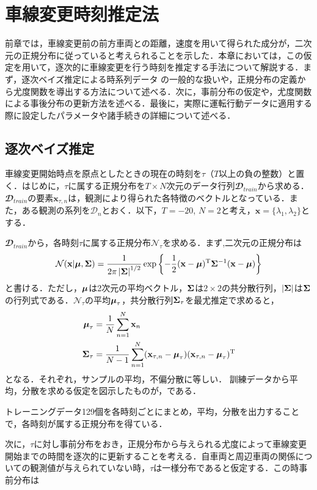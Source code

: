 \chapter{車線変更時刻推定法}
前章では，車線変更前の前方車両との距離，速度を用いて得られた成分が，二次元の正規分布に従っていると考えられることを示した．本章においては，この仮定を用いて，逐次的に車線変更を行う時刻を推定する手法について解説する．まず，逐次ベイズ推定による時系列データ%
の一般的な扱いや，正規分布の定義から尤度関数を導出する方法について述べる．次に，事前分布の仮定や，尤度関数による事後分布の更新方法を述べる．最後に，実際に運転行動データに適用する際に設定したパラメータや諸手続きの詳細について述べる．
\section{逐次ベイズ推定}
車線変更開始時点を原点としたときの現在の時刻を$\tau$（$T$以上の負の整数）と置く．はじめに，$\tau$に属する正規分布を$T\times N$次元のデータ行列$\mathbfcal{D}_\mathit{train}$から求める．$\mathbfcal{D}_\mathit{train}$の要素$\mathbf{x}_{\tau,n}$は，観測により得られた各特徴のベクトルとなっている．また，ある観測の系列を$\mathcal{D}_n$とおく．以下，$T=-20$, $N=2$と考え，$\mathbf{x}=\{\lambda_1, \lambda_2\}$とする．
\par
$\mathbfcal{D}_\mathit{train}$から，各時刻$\tau$に属する正規分布$\mathcal{N}_\tau$を求める．まず,二次元の正規分布は
\begin{align}
	\mathcal{N}(\mathbf{x}|\boldsymbol{\mu},\mathbf{\Sigma})=\frac{1}{2\pi\left|\mathbf{\Sigma}\right|^{1/2}}\exp\left\{-\frac{1}{2}(\mathbf{x}-\boldsymbol{\mu})^\mathrm{T}\mathbf{\Sigma}^{-1}(\mathbf{x}-\boldsymbol{\mu})\right\}
\end{align}
と書ける．ただし，$\boldsymbol{\mu}$は2次元の平均ベクトル，$\mathbf{\Sigma}$は$2\times2$の共分散行列，$\left|\mathbf{\Sigma}\right|$は$\mathbf{\Sigma}$の行列式である．$\mathcal{N}_\tau$の平均$\boldsymbol{\mu}_\tau$，共分散行列$\mathbf{\Sigma}_\tau$を最尤推定で求めると，
\begin{align}
	\boldsymbol{\mu}_\tau&=\frac{1}{N}\sum_{n=1}^N \mathbf{x}_n\\
	\mathbf{\Sigma}_\tau&=\frac{1}{N-1}\sum_{n=1}^N (\mathbf{x}_{\tau,n}-\boldsymbol{\mu}_{\tau})(\mathbf{x}_{\tau,n}-\boldsymbol{\mu}_\tau)^\mathrm{T}
\end{align}
となる．それぞれ，サンプルの平均，不偏分散に等しい．
訓練データから平均，分散を求める仮定を図示したものが，である．

トレーニングデータ129個を各時刻ごとにまとめ，平均，分散を出力することで，各時刻が属する正規分布を得ている．
\par
次に，$\tau$に対し事前分布をおき，正規分布から与えられる尤度によって車線変更開始までの時間を逐次的に更新することを考える．自車両と周辺車両の関係についての観測値が与えられていない時，$\tau$は一様分布であると仮定する．この時事前分布は
